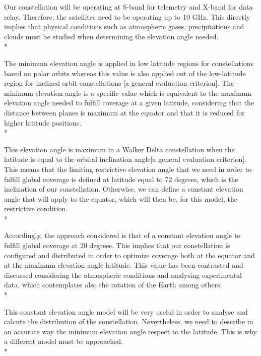 Our constellation will be operating at S-band for telemetry and X-band for data relay. Therefore, the satellites need to be operating up to 10 GHz. This directly implies that physical conditions such as atmospheric gases, precipitations and clouds must be studied when determining the elevation angle needed. \\*

The minimum elevation angle is applied in low latitude regions for constellations based on polar orbits whereas this value is also applied out of the low-latitude region for inclined orbit constellations [a general evaluation criterion]. The minimum elevation angle is a specific value which is equivalent to the maximum elevation angle needed to fulfill coverage at a given latitude, considering that the distance between planes is maximum at the equator and that it is reduced for higher latitude positions.\\*

This elevation angle is maximum in a Walker Delta constellation when the latitude is equal to the orbital inclination angle[a general evaluation criterion]. This means that the limiting restrictive elevation angle that we need in order to fulfill global coverage is defined at latitude equal to 72 degrees, which is the inclination of our constellation. Otherwise, we can define a constant elevation angle that will apply to the equator, which will then be, for this model, the restrictive condition. \\*

Accordingly, the approach considered is that of a constant elevation angle to fulfill global coverage at 20 degrees. This implies that our constellation is configured and distributed in order to optimize coverage both at the equator and at the maximum elevation angle latitude. This value has been contrasted and discussed considering the atmospheric conditions and analysing experimental data, which contemplates also the rotation of the Earth among others. \\*

This constant elevation angle model will be very useful in order to analyse and calcute the distribution of the constellation. Nevertheless, we need to describe in an accurate way the minimum elevation angle respect to the latitude. This is why a different model must be approached. \\*

